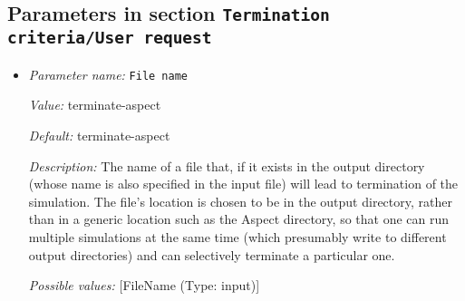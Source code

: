 \subsection{Parameters in section \tt Termination criteria/User request}
\label{parameters:Termination_20criteria/User_20request}

\begin{itemize}
\item {\it Parameter name:} {\tt File name}


{\it Value:} terminate-aspect


{\it Default:} terminate-aspect


{\it Description:} The name of a file that, if it exists in the output directory (whose name is also specified in the input file) will lead to termination of the simulation. The file's location is chosen to be in the output directory, rather than in a generic location such as the Aspect directory, so that one can run multiple simulations at the same time (which presumably write to different output directories) and can selectively terminate a particular one.


{\it Possible values:} [FileName (Type: input)]
\end{itemize}
